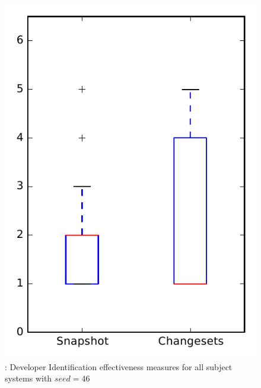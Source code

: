 
\begin{figure}
\centering
\includegraphics[height=0.4\textheight]{figures/dit_seed/rq1_overview_46}
\caption{\rtwo: Developer Identification effectiveness measures for all subject systems with $seed=46$}
\label{fig:dit_seed:rq1:overview}
\end{figure}
